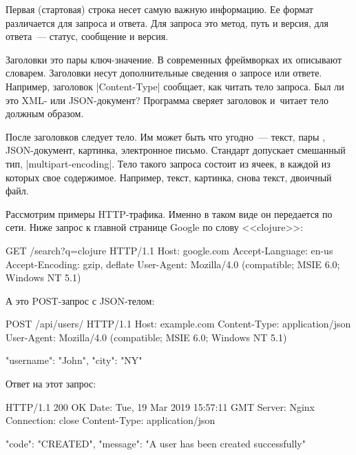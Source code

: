 Первая (стартовая) строка несет самую важную информацию. Ее формат различается
для запроса и ответа. Для запроса это метод, путь и версия, для ответа~---
статус, сообщение и версия.

Заголовки это пары ключ-значение. В современных фреймворках их описывают
словарем. Заголовки несут дополнительные сведения о запросе или
ответе. Например, заголовок \spverb|Content-Type| сообщает, как читать тело
запроса. Был ли это XML- или JSON-документ? Программа сверяет заголовок и~читает
тело должным образом.

После заголовков следует тело. Им может быть что угодно~--- текст, пары
, JSON-документ, картинка, электронное письмо. Стандарт
допускает смешанный тип, \spverb|multipart-encoding|. Тело такого запроса
состоит из ячеек, в каждой из которых свое содержимое. Например, текст,
картинка, снова текст, двоичный файл.

Рассмотрим примеры HTTP-трафика. Именно в таком виде он передается по сети. Ниже
запрос к главной странице Google по слову <<clojure>>:

\begin{english}
  \begin{http}
GET /search?q=clojure HTTP/1.1
Host: google.com
Accept-Language: en-us
Accept-Encoding: gzip, deflate
User-Agent: Mozilla/4.0 (compatible; MSIE 6.0; Windows NT 5.1)
  \end{http}
\end{english}

\noindent
А это POST-запрос с JSON-телом:

\begin{english}
  \begin{http}
POST /api/users/ HTTP/1.1
Host: example.com
Content-Type: application/json
User-Agent: Mozilla/4.0 (compatible; MSIE 6.0; Windows NT 5.1)

{
  "username": "John",
  "city": "NY"
}
  \end{http}
\end{english}

\noindent
Ответ на этот запрос:

\begin{english}
  \begin{http}
HTTP/1.1 200 OK
Date: Tue, 19 Mar 2019 15:57:11 GMT
Server: Nginx
Connection: close
Content-Type: application/json

{
  "code": "CREATED",
  "message": "A user has been created successfully"
}
  \end{http}
\end{english}

